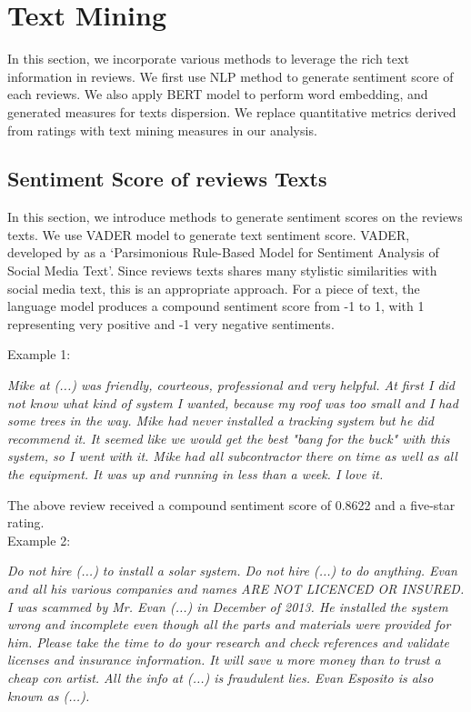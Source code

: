 \documentclass[msom,blindrev]{informs3}
\begin{document}
\section{Text Mining}


In this section, we incorporate various methods to leverage the rich text information in reviews.  We first use NLP method to generate sentiment score of each reviews. We also apply BERT model to perform word embedding, and generated measures for texts dispersion. We replace quantitative metrics derived from ratings with text mining measures in our analysis.

\subsection{Sentiment Score of reviews Texts}
In this section, we introduce methods to generate sentiment scores on the reviews texts. We use VADER model to generate text sentiment score. VADER, developed by  \cite{hutto2014vader} as a `Parsimonious Rule-Based Model for Sentiment Analysis of Social Media Text'. Since reviews texts shares many stylistic similarities with social media text, this is an appropriate approach. For a piece of text, the language model produces a compound sentiment score from -1 to 1, with 1 representing very positive and -1  very negative sentiments.


Example 1:

\textit{Mike at (...) was friendly, courteous, professional and very helpful.  At first I did not know what kind of system I wanted, because my roof was too small and I had some trees in the way.  Mike had never installed a tracking system but he did recommend it.  It seemed like we would get the best "bang for the buck" with this system, so I went with it.  Mike had all subcontractor there on time as well as all the equipment.  It was up and running in less than a week.  I love it.}

The above review received a compound sentiment score of 0.8622 and a five-star rating. \\
Example 2:

\textit{Do not hire (...)  to install a solar system. Do not hire (...) to do anything. Evan   and all his various companies and names  ARE NOT LICENCED OR INSURED. I was scammed by Mr. Evan (...) in December of 2013. He installed the system wrong and incomplete even though all the parts and materials were provided for him. Please take the time to do your research and check references and validate licenses and insurance information. It will save u more money than to trust a cheap con artist. All the info at (...)  is fraudulent lies. Evan Esposito is also known as (...).}
\end{document}
